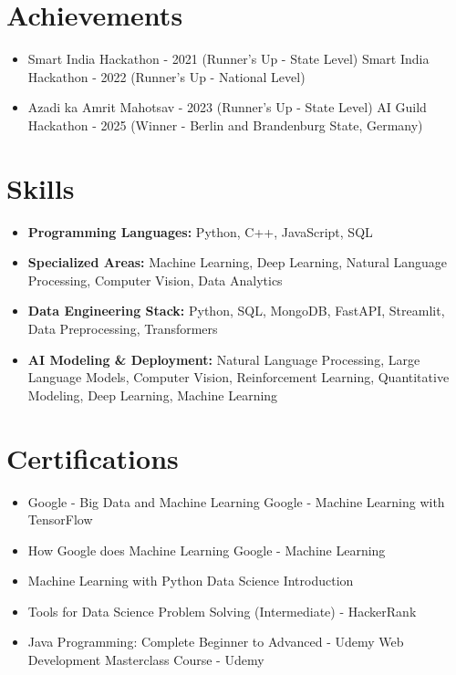 \documentclass[a4paper,10pt]{article}
\begin{document}
\section*{Achievements}
\begin{itemize}
\item Smart India Hackathon - 2021 (Runner's Up - State Level) \hfill Smart India Hackathon - 2022 (Runner's Up - National Level)
\item Azadi ka Amrit Mahotsav - 2023 (Runner's Up - State Level) \hfill AI Guild Hackathon - 2025 (Winner - Berlin and Brandenburg State, Germany)
\end{itemize}

\section*{Skills}
\begin{itemize}
  \item \textbf{Programming Languages:} Python, C++, JavaScript, SQL
  \item \textbf{Specialized Areas:} Machine Learning, Deep Learning, Natural Language Processing, Computer Vision, Data Analytics
  \item \textbf{Data Engineering Stack:} Python, SQL, MongoDB, FastAPI, Streamlit, Data Preprocessing, Transformers
  \item \textbf{AI Modeling \& Deployment:} Natural Language Processing, Large Language Models, Computer Vision, Reinforcement Learning, Quantitative Modeling, Deep Learning, Machine Learning
\end{itemize}

\section*{Certifications}
\begin{itemize}
\item Google - Big Data and Machine Learning \hfill Google - Machine Learning with TensorFlow
\item How Google does Machine Learning \hfill Google - Machine Learning
\item Machine Learning with Python \hfill Data Science Introduction
\item Tools for Data Science \hfill Problem Solving (Intermediate) - HackerRank
\item Java Programming: Complete Beginner to Advanced - Udemy \hfill Web Development Masterclass Course - Udemy
\end{itemize}
\end{document}
